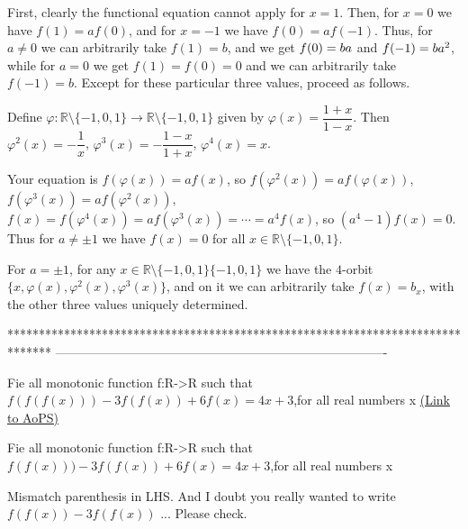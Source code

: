 \begin{solution}
	First, clearly the functional equation cannot apply for $x=1$. Then, for $x=0$ we have $f(1)=af(0)$, and for $x=-1$ we have $f(0)=af(-1)$. Thus, for $a\neq 0$ we can arbitrarily take $f(1) = b$, and we get $f(0)=b\/a$ and $f(-1) = b\/a^2$, while for $a=0$ we get $f(1) = f(0)=0$ and we can arbitrarily take $f(-1) = b$. Except for these particular three values, proceed as follows.

Define $\varphi : \mathbb{R}\setminus \{-1,0,1\} \to \mathbb{R}\setminus \{-1,0,1\} $ given by $\varphi(x)=\dfrac {1+x} {1-x}$. Then $\varphi^2(x) = -\dfrac {1} {x}$, $\varphi^3(x) = -\dfrac {1-x} {1+x}$, $\varphi^4(x) = x$.

Your equation is $f(\varphi(x)) = af(x)$, so $f(\varphi^2(x)) = af(\varphi(x))$, $f(\varphi^3(x)) = af(\varphi^2(x))$, $f(x) = f(\varphi^4(x)) = af(\varphi^3(x)) = \cdots = a^4f(x)$, so $(a^4-1)f(x) = 0$. Thus for $a\neq \pm 1$ we have $f(x) = 0$ for all $x\in \mathbb{R}\setminus \{-1,0,1\}$.

For $a=\pm 1$, for any $x \in \mathbb{R}\setminus  \{-1,0,1\} \{-1,0,1\}$ we have the $4$-orbit $\{x,\varphi(x), \varphi^2(x), \varphi^3(x)\}$, and on it we can arbitrarily take $f(x) = b_x$, with the other three values uniquely determined.
\end{solution}
*******************************************************************************
-------------------------------------------------------------------------------

\begin{problem}
	Fie all monotonic function f:R->R such that $f(f(f(x)))-3f(f(x))+6f(x)=4x+3$,for all real numbers x
	\flushright \href{https://artofproblemsolving.com/community/c6h578967}{(Link to AoPS)}
\end{problem}



\begin{solution}
	\begin{tcolorbox}Fie all monotonic function f:R->R such that $f(f(x)))-3f(f(x))+6f(x)=4x+3$,for all real numbers x\end{tcolorbox}
Mismatch parenthesis in LHS. And I doubt you really wanted to write $f(f(x))-3f(f(x))$ ...
Please check.
\end{solution}




